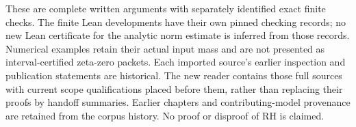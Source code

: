 These are complete written arguments with separately identified exact
finite checks. The finite Lean developments have their own pinned checking
records; no new Lean certificate for the analytic norm estimate is
inferred from those records. Numerical examples retain their actual input
mass and are not presented as interval-certified zeta-zero packets.
Each imported source's earlier inspection and publication statements are
historical. The new reader contains those full sources with current scope
qualifications placed before them, rather than replacing their proofs by
handoff summaries. Earlier chapters and contributing-model provenance are
retained from the corpus history. No proof or disproof of RH is claimed.
\clearpage

